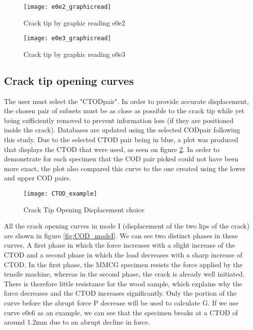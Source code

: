 \begin{figure}[htp]
	\begin{minipage}[c]{.46\linewidth}
		\centering
		\texttt{[image: e0e2\_graphicread]}
		\caption{Crack tip by graphic reading e0e2}
		\label{fig:fig39}
	\end{minipage}
	\hfill%
	\begin{minipage}[c]{.46\linewidth}
		\centering
		\texttt{[image: e0e3\_graphicread]}
		\caption{Crack tip by graphic reading e0e3 }
		\label{fig:fig40}
	\end{minipage}
\end{figure}


\subsection{Crack tip opening curves}

The user must select the "CTODpair". In order to provide accurate displacement, the chosen pair of subsets must be as close as possible to the crack tip while yet being sufficiently removed to prevent information loss (if they are positioned inside the crack). Databases are updated using the selected CODpair following this study. Due to the selected CTOD pair being in blue, a plot was produced that displays the CTOD that were used, as seen on figure \ref{fig:CTOD_example}. In order to demonstrate for each specimen that the COD pair picked could not have been more exact, the plot also compared this curve to the one created using the lower and upper COD pairs.

\begin{figure}[htp]
	\centering
	\texttt{[image: CTOD\_example]}
	\caption{Crack Tip Opening Displacement choice}
	\label{fig:CTOD_example}
\end{figure}

All the crack opening curves in mode I (displacement of the two lips of the crack) are shown in figure \ref{fig:COD_modeI}. 
We can see two distinct phases in these curves. A first phase in which the force increases with a slight increase of the CTOD and a second phase in which the load decreases with a sharp increase of CTOD. In the first phase, the MMCG specimen resists the force applied by the tensile machine, whereas in the second phase, the crack is already well initiated. There is therefore little resistance for the wood sample, which explains why the force decreases and the CTOD increases significantly.
Only the portion of the curve before the abrupt force P decrease will be used to calculate G. If we use curve e0e6 as an example, we can see that the specimen breaks at a CTOD of around 1.2mm due to an abrupt decline in force.

